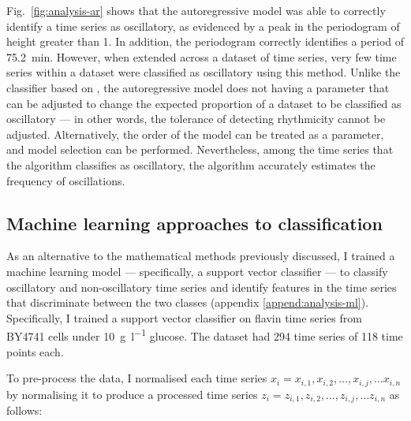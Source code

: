 Fig.\ \ref{fig:analysis-ar} shows that the autoregressive model was able to correctly identify a time series as oscillatory, as evidenced by a peak in the periodogram of height greater than 1.
In addition, the periodogram correctly identifies a period of \SI{75.2}{\minute}.
However, when extended across a dataset of time series, very few time series within a dataset were classified as oscillatory using this method.
Unlike the classifier based on \textcite{glynnDetectingPeriodicPatterns2006a}, the autoregressive model does not having a parameter that can be adjusted to change the expected proportion of a dataset to be classified as oscillatory --- in other words, the tolerance of detecting rhythmicity cannot be adjusted.
Alternatively, the order of the model can be treated as a parameter, and model selection can be performed.
Nevertheless, among the time series that the algorithm classifies as oscillatory, the algorithm accurately estimates the frequency of oscillations.


\subsection{Machine learning approaches to classification}
\label{subsec:analysis-classification-ml}



As an alternative to the mathematical methods previously discussed, I trained a machine learning model --- specifically, a support vector classifier --- to classify oscillatory and non-oscillatory time series and identify features in the time series that discriminate between the two classes (appendix \ref{append:analysis-ml}).
%
Specifically, I trained a support vector classifier on flavin time series from BY4741 cells  under \SI{10}{\gram~\litre^{-1}} glucose.
The dataset had 294 time series of 118 time points each.


To pre-process the data, I normalised each time series $x_{i} = x_{i,1}, x_{i,2}, \ldots , x_{i,j}, \ldots x_{i,n}$ by normalising it to produce a processed time series $z_{i} = z_{i,1}, z_{i,2}, \ldots , z_{i,j}, \ldots z_{i,n}$ as follows:

